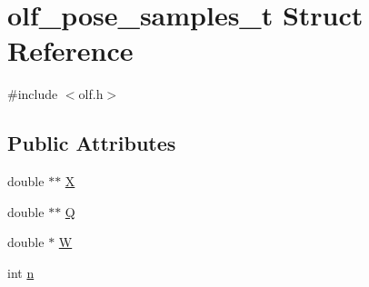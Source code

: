 \hypertarget{structolf__pose__samples__t}{
\section{olf\_\-pose\_\-samples\_\-t Struct Reference}
\label{structolf__pose__samples__t}
}


{\ttfamily \#include $<$olf.h$>$}

\subsection*{Public Attributes}
\begin{DoxyCompactItemize}
\item 
double $\ast$$\ast$ \hyperlink{structolf__pose__samples__t_a1ad30c2edd5fcfca674a0aaf44c5bb3b}{X}
\item 
double $\ast$$\ast$ \hyperlink{structolf__pose__samples__t_a2625674be57ee0188d1ff0d28cdd55d7}{Q}
\item 
double $\ast$ \hyperlink{structolf__pose__samples__t_a3be0f7272463bba2a01c3bf0f7e20412}{W}
\item 
int \hyperlink{structolf__pose__samples__t_a26dc2afb24ba13c4efe49d4c75cf52a2}{n}
\end{DoxyCompactItemize}


